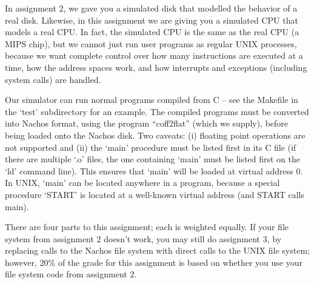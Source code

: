 In assignment 2, we gave you a simulated disk that modelled the
behavior of a real disk.  Likewise, in this assignment we are giving
you a simulated CPU that models a real CPU.  In fact, the simulated
CPU is the same as the real CPU (a MIPS chip), but we cannot just run
user programs as regular UNIX processes, because we want complete
control over how many instructions are executed at a time, how the
address spaces work, and how interrupts and exceptions (including
system calls) are handled.

Our simulator can run normal programs compiled from C -- see 
the Makefile in the `test' subdirectory for an example.  The compiled
programs must be converted into Nachos format, using the
program ``coff2flat'' (which we supply), before being loaded onto 
the Nachos disk.  Two caveats: (i) floating point operations are not supported
and (ii) the `main' procedure must be listed first in its C file
(if there are multiple `.o' files, the one containing `main' must be 
listed first on the `ld' command line).  This ensures that `main' 
will be loaded at virtual address 0.  In UNIX, `main' can be located 
anywhere in a program, because a special procedure `START' is located
at a well-known virtual address (and START calls main).

There are four parts to this assignment; each is weighted equally.
If your file system from assignment 2 doesn't work, you may still 
do assignment 3, by replacing calls to the Nachos file system with
direct calls to the UNIX file system; however, 20\% of the grade for
this assignment is based on whether you use your file system code from
assignment 2.

